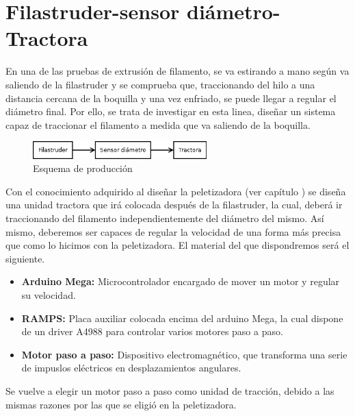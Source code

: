 \section{Filastruder-sensor diámetro-Tractora}
\label{sec:FSB}

En una de las pruebas de extrusión de filamento, se va estirando a mano según va saliendo de la filastruder y se comprueba que, traccionando del hilo a una distancia cercana de la boquilla y una vez enfriado, se puede llegar a regular el diámetro final. Por ello, se trata de investigar en esta linea, diseñar un sistema capaz de traccionar el filamento a medida que va saliendo de la boquilla.

	\begin{figure}[H]
            \centering
            \includegraphics[width=0.6\textwidth]{images/producciones/Diagram2.png}
            \caption{Esquema de producción}
            \label{fig:esquemap_FST}
    \end{figure}

Con el conocimiento adquirido al diseñar la peletizadora (ver capítulo ) se diseña una unidad tractora que irá colocada después de la filastruder, la cual, deberá ir traccionando del filamento independientemente del diámetro del mismo. Así mismo, deberemos ser capaces de regular la velocidad de una forma más precisa que como lo hicimos con la peletizadora. El material del que dispondremos será el siguiente.

\begin{itemize}
	\item{\textbf{Arduino Mega:} Microcontrolador encargado de mover un motor y regular su velocidad.}
	\item{\textbf{RAMPS:} Placa auxiliar colocada encima del arduino Mega, la cual dispone de un driver A4988 para controlar varios motores paso a paso.}
	\item{\textbf{Motor paso a paso:} Dispositivo electromagnético, que transforma una serie de impuslos eléctricos en desplazamientos angulares.}
\end{itemize}

Se vuelve a elegir un motor paso a paso como unidad de tracción, debido a las mismas razones por las que se eligió en la peletizadora.\\

